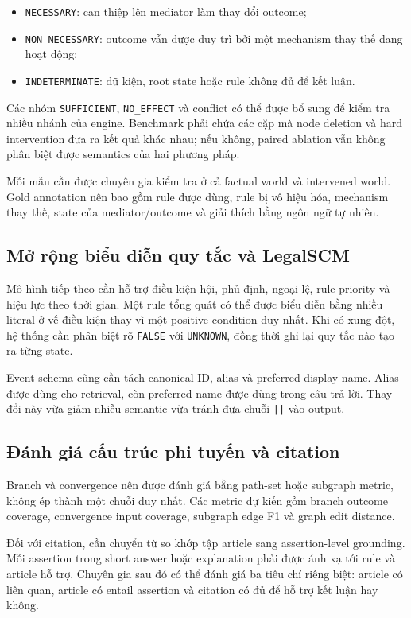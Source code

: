 \begin{itemize}
    \item \texttt{NECESSARY}: can thiệp lên mediator làm thay đổi outcome;
    \item \texttt{NON\_NECESSARY}: outcome vẫn được duy trì bởi một mechanism
    thay thế đang hoạt động;
    \item \texttt{INDETERMINATE}: dữ kiện, root state hoặc rule không đủ để
    kết luận.
\end{itemize}

Các nhóm \texttt{SUFFICIENT}, \texttt{NO\_EFFECT} và conflict có thể được
bổ sung để kiểm tra nhiều nhánh của engine. Benchmark phải chứa các cặp mà
node deletion và hard intervention đưa ra kết quả khác nhau; nếu không,
paired ablation vẫn không phân biệt được semantics của hai phương pháp.

Mỗi mẫu cần được chuyên gia kiểm tra ở cả factual world và intervened world.
Gold annotation nên bao gồm rule được dùng, rule bị vô hiệu hóa, mechanism
thay thế, state của mediator/outcome và giải thích bằng ngôn ngữ tự nhiên.

\subsection{Mở rộng biểu diễn quy tắc và LegalSCM}

Mô hình tiếp theo cần hỗ trợ điều kiện hội, phủ định, ngoại lệ, rule priority
và hiệu lực theo thời gian. Một rule tổng quát có thể được biểu diễn bằng
nhiều literal ở vế điều kiện thay vì một positive condition duy nhất. Khi có
xung đột, hệ thống cần phân biệt rõ \texttt{FALSE} với
\texttt{UNKNOWN}, đồng thời ghi lại quy tắc nào tạo ra từng state.

Event schema cũng cần tách canonical ID, alias và preferred display name.
Alias được dùng cho retrieval, còn preferred name được dùng trong câu trả
lời. Thay đổi này vừa giảm nhiễu semantic vừa tránh đưa chuỗi
\texttt{||} vào output.

\subsection{Đánh giá cấu trúc phi tuyến và citation}

Branch và convergence nên được đánh giá bằng path-set hoặc subgraph metric,
không ép thành một chuỗi duy nhất. Các metric dự kiến gồm branch outcome
coverage, convergence input coverage, subgraph edge F1 và graph edit
distance.

Đối với citation, cần chuyển từ so khớp tập article sang assertion-level
grounding. Mỗi assertion trong short answer hoặc explanation phải được ánh
xạ tới rule và article hỗ trợ. Chuyên gia sau đó có thể đánh giá ba tiêu chí
riêng biệt: article có liên quan, article có entail assertion và citation có
đủ để hỗ trợ kết luận hay không.

